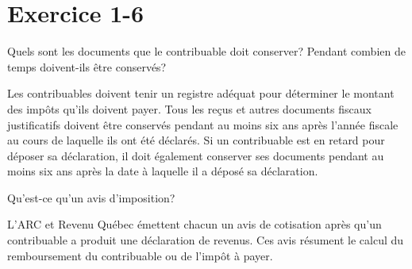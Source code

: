 \section{Exercice 1-6}
\setcounter{question}{0}
\begin{question}
	Quels sont les documents que le contribuable doit conserver? Pendant combien de temps doivent-ils être conservés?
\end{question}
Les contribuables doivent tenir un registre adéquat pour déterminer le montant des impôts qu'ils doivent payer. Tous les reçus et autres documents fiscaux justificatifs doivent être conservés pendant au moins six ans après l'année fiscale au cours de laquelle ils ont été déclarés. Si un contribuable est en retard pour déposer sa déclaration, il doit également conserver ses documents pendant au moins six ans après la date à laquelle il a déposé sa déclaration.

\begin{question}
	Qu'est-ce qu'un avis d'imposition?
\end{question}
L'ARC et Revenu Québec émettent chacun un avis de cotisation après qu'un contribuable a produit une déclaration de revenus. Ces avis résument le calcul du remboursement du contribuable ou de l'impôt à payer.



